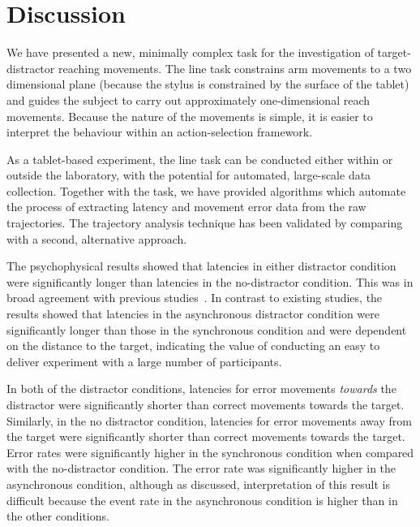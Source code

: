 \documentclass[10pt,letterpaper]{article}
\begin{document}
\section*{Discussion}

We have presented a new, minimally complex task for the investigation
of target-distractor reaching movements.  The line task constrains arm
movements to a two dimensional plane (because the stylus is
constrained by the surface of the tablet) and guides the subject to
carry out approximately one-dimensional reach movements. Because the
nature of the movements is simple, it is easier to interpret the
behaviour within an action-selection framework.

As a tablet-based experiment, the line task can be conducted either
within or outside the laboratory, with the potential for automated,
large-scale data collection.
%
Together with the task, we have provided algorithms
which automate the process of extracting latency
and movement error data from the raw trajectories. The trajectory
analysis technique has been validated by comparing with a second,
alternative approach.




The psychophysical results showed that latencies in either distractor
condition were significantly longer than latencies in the
no-distractor condition. This was in broad agreement with previous
studies~\cite{tipper_selective_1992,meegan_visual_1999,pratt_action-centered_1994}.
In contrast to existing studies, the results showed that latencies in
the asynchronous distractor condition were significantly longer than
those in the synchronous condition and were dependent on the distance
to the target, indicating the value of conducting an easy to deliver
experiment with a large number of participants.

In both of the distractor conditions, latencies for error movements
\emph{towards} the distractor were significantly shorter than correct
movements towards the target. Similarly, in the no distractor
condition, latencies for error movements away from the target were
significantly shorter than correct movements towards the target. Error
rates were significantly higher in the synchronous condition when
compared with the no-distractor condition. The error rate was
significantly higher in the asynchronous condition, although as
discussed, interpretation of this result is difficult because the
event rate in the asynchronous condition is higher than in the other
conditions.
\end{document}
